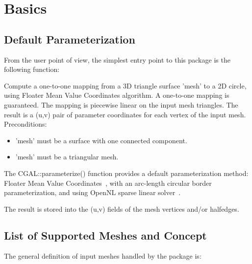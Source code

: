\section{Basics}


\subsection{Default Parameterization}

From the user point of view, the simplest entry point to this package
is the following function:

{ Compute a one-to-one mapping from a 3D triangle surface 'mesh' to a
2D circle, using Floater Mean Value Coordinates algorithm. A
one-to-one mapping is guaranteed. The mapping is piecewise linear on
the input mesh triangles. The result is a (u,v) pair of parameter
coordinates for each vertex of the input mesh.
Preconditions:\begin{itemize}
\item 'mesh' must be a surface with one connected component.\item 'mesh' must be a triangular mesh.\end{itemize}
}

The CGAL::parameterize() function provides a default parameterization
method: Floater Mean Value Coordinates~\cite{cgal:f-mvc-03}, with an
arc-length circular border parameterization, and using OpenNL sparse
linear solver~\cite{cgal:l-nmdgp-05}.

The result is stored into the (u,v) fields of the mesh vertices and/or
halfedges.


\subsection{List of Supported Meshes and Concept}

The general definition of input meshes handled by the package is:

